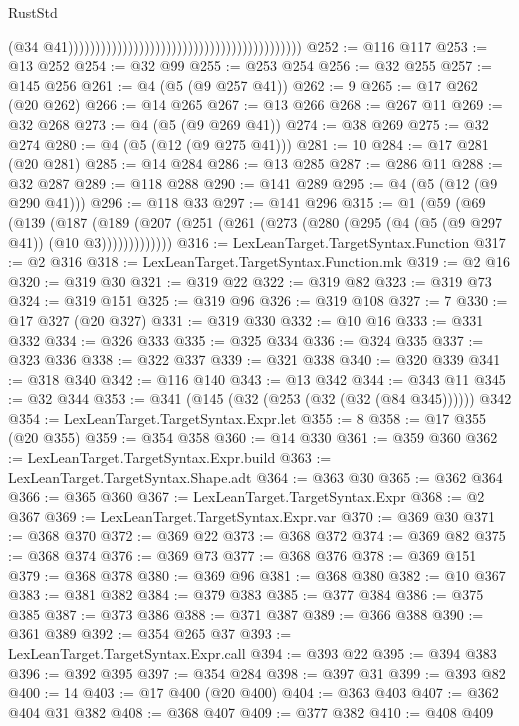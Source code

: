 \begin{lexlean}{RustStd}
\begin{coremodule}
{\begin{coremodule}
{{{{{{{{{{{{{{{{{{{{{{{{{{{{{{{{{{{{{{{{{{{{{{{{{{                                                                                        (@34
                                                                                          @41)))))))))))))))))))))))))))))))))))))))))))
@252 := @116 @117
@253 := @13 @252
@254 := @32 @99
@255 := @253 @254
@256 := @32 @255
@257 := @145 @256
@261 := @4 (@5 (@9 @257 @41))
@262 := 9
@265 := @17 @262 (@20 @262)
@266 := @14 @265
@267 := @13 @266
@268 := @267 @11
@269 := @32 @268
@273 := @4 (@5 (@9 @269 @41))
@274 := @38 @269
@275 := @32 @274
@280 := @4 (@5 (@12 (@9 @275 @41)))
@281 := 10
@284 := @17 @281 (@20 @281)
@285 := @14 @284
@286 := @13 @285
@287 := @286 @11
@288 := @32 @287
@289 := @118 @288
@290 := @141 @289
@295 := @4 (@5 (@12 (@9 @290 @41)))
@296 := @118 @33
@297 := @141 @296
@315 := @1
    (@59
      (@69
        (@139
          (@187
            (@189 (@207 (@251 (@261 (@273 (@280 (@295 (@4 (@5 (@9 @297 @41)) (@10 @3)))))))))))))
@316 := LexLeanTarget.TargetSyntax.Function
@317 := @2 @316
@318 := LexLeanTarget.TargetSyntax.Function.mk
@319 := @2 @16
@320 := @319 @30
@321 := @319 @22
@322 := @319 @82
@323 := @319 @73
@324 := @319 @151
@325 := @319 @96
@326 := @319 @108
@327 := 7
@330 := @17 @327 (@20 @327)
@331 := @319 @330
@332 := @10 @16
@333 := @331 @332
@334 := @326 @333
@335 := @325 @334
@336 := @324 @335
@337 := @323 @336
@338 := @322 @337
@339 := @321 @338
@340 := @320 @339
@341 := @318 @340
@342 := @116 @140
@343 := @13 @342
@344 := @343 @11
@345 := @32 @344
@353 := @341 (@145 (@32 (@253 (@32 (@32 (@84 @345)))))) @342
@354 := LexLeanTarget.TargetSyntax.Expr.let
@355 := 8
@358 := @17 @355 (@20 @355)
@359 := @354 @358
@360 := @14 @330
@361 := @359 @360
@362 := LexLeanTarget.TargetSyntax.Expr.build
@363 := LexLeanTarget.TargetSyntax.Shape.adt
@364 := @363 @30
@365 := @362 @364
@366 := @365 @360
@367 := LexLeanTarget.TargetSyntax.Expr
@368 := @2 @367
@369 := LexLeanTarget.TargetSyntax.Expr.var
@370 := @369 @30
@371 := @368 @370
@372 := @369 @22
@373 := @368 @372
@374 := @369 @82
@375 := @368 @374
@376 := @369 @73
@377 := @368 @376
@378 := @369 @151
@379 := @368 @378
@380 := @369 @96
@381 := @368 @380
@382 := @10 @367
@383 := @381 @382
@384 := @379 @383
@385 := @377 @384
@386 := @375 @385
@387 := @373 @386
@388 := @371 @387
@389 := @366 @388
@390 := @361 @389
@392 := @354 @265 @37
@393 := LexLeanTarget.TargetSyntax.Expr.call
@394 := @393 @22
@395 := @394 @383
@396 := @392 @395
@397 := @354 @284
@398 := @397 @31
@399 := @393 @82
@400 := 14
@403 := @17 @400 (@20 @400)
@404 := @363 @403
@407 := @362 @404 @31 @382
@408 := @368 @407
@409 := @377 @382
@410 := @408 @409
}}}}}}}}}}}}}}}}}}}}}}}}}}}}}}}}}}}}}}}}}}}}}}}}}}
\end{coremodule}}
\end{coremodule}
\end{lexlean}

